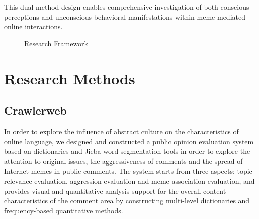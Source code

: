 \documentclass[12pt,a4paper]{ctexart}
\theoremstyle{MyLineTheoremStyle}
\theoremstyle{MyBlockTheoremStyle}
\theoremstyle{MySubsubsectionStyle}
\begin{document}
This dual-method design enables comprehensive investigation of both conscious perceptions and unconscious behavioral manifestations within meme-mediated online interactions.

\begin{figure}[htbp]
    \centering
    \caption{Research Framework}
    \label{fig:research_process}
\end{figure}
\newpage

\section{Research Methods}

\subsection{Crawlerweb}

In order to explore the influence of abstract culture on the characteristics of online language, we designed and constructed a public opinion evaluation system based on dictionaries and Jieba word segmentation tools in order to explore the attention to original issues, the aggressiveness of comments and the spread of Internet memes in public comments. The system starts from three aspects: topic relevance evaluation, aggression evaluation and meme association evaluation, and provides visual and quantitative analysis support for the overall content characteristics of the comment area by constructing multi-level dictionaries and frequency-based quantitative methods.
\end{document}
